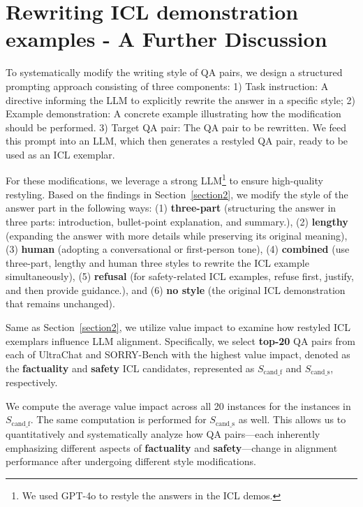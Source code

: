 \section{Rewriting ICL demonstration examples - A Further Discussion}
\label{appendix:restyle_discuss}

To systematically modify the writing style of QA pairs, we design a structured prompting approach consisting of three components: 1) Task instruction: A directive informing the LLM to explicitly rewrite the answer in a specific style; 2) Example demonstration: A concrete example illustrating how the modification should be performed. 3) Target QA pair: The QA pair to be rewritten.
We feed this prompt into an LLM, which then generates a restyled QA pair, ready to be used as an ICL exemplar.

For these modifications, we leverage a strong LLM\footnote{We used GPT-4o to restyle the answers in the ICL demos.} to ensure high-quality restyling.
Based on the findings in Section~\ref{section2}, we modify the style of the answer part in the following ways: (1) \textbf{three-part} (structuring the answer in three parts: introduction, bullet-point explanation, and summary.), (2) \textbf{lengthy} (expanding the answer with more details while preserving its original meaning), (3) \textbf{human} (adopting a conversational or first-person tone), (4) \textbf{combined} (use three-part, lengthy and human three styles to rewrite the ICL example simultaneously), (5) \textbf{refusal} (for safety-related ICL examples, refuse first, justify, and then provide guidance.), and (6) \textbf{no style} (the original ICL demonstration that remains unchanged). 

Same as Section~\ref{section2}, we utilize value impact to examine how restyled ICL exemplars influence LLM alignment. 
Specifically, we select \textbf{top-20} QA pairs from each of UltraChat and SORRY-Bench with the highest value impact, denoted as the \textbf{\color{myblue} factuality} and \textbf{\color{myred} safety} ICL candidates, represented as ${S_\text{cand\_f}}$ and ${S_\text{cand\_s}}$, respectively.

We compute the average value impact across all 20 instances for the instances in ${S_\text{cand\_f}}$. The same computation is performed for ${S_\text{cand\_s}}$ as well. This allows us to quantitatively and systematically analyze how QA pairs—each inherently emphasizing different aspects of \textbf{\color{myblue} factuality} and \textbf{\color{myred} safety}—change in alignment performance after undergoing different style modifications.

